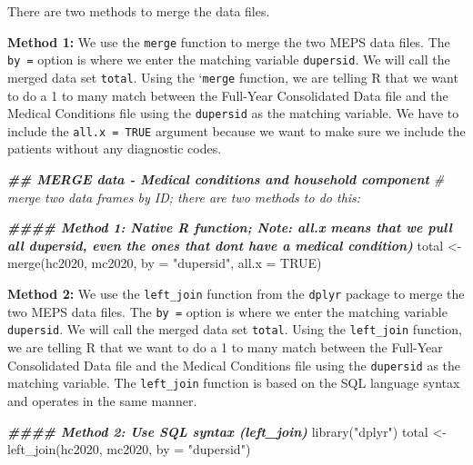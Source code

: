 \documentclass[
]{book}
\newenvironment{Shaded}{\begin{snugshade}}{\end{snugshade}}
\newcommand{\AttributeTok}[1]{\textcolor[rgb]{0.77,0.63,0.00}{#1}}
\newcommand{\CommentTok}[1]{\textcolor[rgb]{0.56,0.35,0.01}{\textit{#1}}}
\newcommand{\ConstantTok}[1]{\textcolor[rgb]{0.00,0.00,0.00}{#1}}
\newcommand{\DocumentationTok}[1]{\textcolor[rgb]{0.56,0.35,0.01}{\textbf{\textit{#1}}}}
\newcommand{\FunctionTok}[1]{\textcolor[rgb]{0.00,0.00,0.00}{#1}}
\newcommand{\NormalTok}[1]{#1}
\newcommand{\OtherTok}[1]{\textcolor[rgb]{0.56,0.35,0.01}{#1}}
\newcommand{\StringTok}[1]{\textcolor[rgb]{0.31,0.60,0.02}{#1}}
\begin{document}
There are two methods to merge the data files.

\textbf{Method 1:} We use the \texttt{merge} function to merge the two MEPS data files. The \texttt{by\ =} option is where we enter the matching variable \texttt{dupersid}. We will call the merged data set \texttt{total}. Using the `\texttt{merge} function, we are telling R that we want to do a 1 to many match between the Full-Year Consolidated Data file and the Medical Conditions file using the \texttt{dupersid} as the matching variable. We have to include the \texttt{all.x\ =\ TRUE} argument because we want to make sure we include the patients without any diagnostic codes.

\begin{Shaded}
\begin{Highlighting}[]
\DocumentationTok{\#\# MERGE data {-} Medical conditions and household component}
\CommentTok{\# merge two data frames by ID; there are two methods to do this:}

\DocumentationTok{\#\#\#\# Method 1: Native R function; Note: all.x means that we pull all dupersid, even the ones that don\textquotesingle{}t have a medical condition)}
\NormalTok{total }\OtherTok{\textless{}{-}} \FunctionTok{merge}\NormalTok{(hc2020, mc2020, }\AttributeTok{by =} \StringTok{"dupersid"}\NormalTok{, }\AttributeTok{all.x =} \ConstantTok{TRUE}\NormalTok{)}
\end{Highlighting}
\end{Shaded}

\textbf{Method 2:} We use the \texttt{left\_join} function from the \texttt{dplyr} package to merge the two MEPS data files. The \texttt{by\ =} option is where we enter the matching variable \texttt{dupersid}. We will call the merged data set \texttt{total}. Using the \texttt{left\_join} function, we are telling R that we want to do a 1 to many match between the Full-Year Consolidated Data file and the Medical Conditions file using the \texttt{dupersid} as the matching variable. The \texttt{left\_join} function is based on the SQL language syntax and operates in the same manner.

\begin{Shaded}
\begin{Highlighting}[]
\DocumentationTok{\#\#\#\# Method 2: Use SQL syntax (left\_join)}
\FunctionTok{library}\NormalTok{(}\StringTok{"dplyr"}\NormalTok{)}
\NormalTok{total }\OtherTok{\textless{}{-}} \FunctionTok{left\_join}\NormalTok{(hc2020, mc2020, }\AttributeTok{by =} \StringTok{"dupersid"}\NormalTok{)}
\end{Highlighting}
\end{Shaded}
\end{document}
